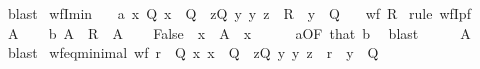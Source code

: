 \begin{isabellebody}
\ blast%
\endisatagproof
{\isafoldproof}%
%
\isadelimproof
\isanewline
%
\endisadelimproof
\isanewline
{}\isamarkupfalse%
\ wfI{\isacharunderscore}{\kern0pt}min{\isacharcolon}{\kern0pt}\isanewline
\ \ \ a{\isacharcolon}{\kern0pt}\ {\isachardoublequoteopen}{\isasymAnd}x\ Q{\isachardot}{\kern0pt}\ x\ {\isasymin}\ Q\ {\isasymLongrightarrow}\ {\isasymexists}z{\isasymin}Q{\isachardot}{\kern0pt}\ {\isasymforall}y{\isachardot}{\kern0pt}\ {\isacharparenleft}{\kern0pt}y{\isacharcomma}{\kern0pt}\ z{\isacharparenright}{\kern0pt}\ {\isasymin}\ R\ {\isasymlongrightarrow}\ y\ {\isasymnotin}\ Q{\isachardoublequoteclose}\isanewline
\ \ \ {\isachardoublequoteopen}wf\ R{\isachardoublequoteclose}\isanewline
%
\isadelimproof
%
\endisadelimproof
%
\isatagproof
{}\isamarkupfalse%
\ {\isacharparenleft}{\kern0pt}rule\ wfI{\isacharunderscore}{\kern0pt}pf{\isacharparenright}{\kern0pt}\isanewline
\ \ \isamarkupfalse%
\ A\isanewline
\ \ \isamarkupfalse%
\ b{\isacharcolon}{\kern0pt}\ {\isachardoublequoteopen}A\ {\isasymsubseteq}\ R\ {\isacharbackquote}{\kern0pt}{\isacharbackquote}{\kern0pt}\ A{\isachardoublequoteclose}\isanewline
\ \ \isamarkupfalse%
\ False\ \ {\isachardoublequoteopen}x\ {\isasymin}\ A{\isachardoublequoteclose}\ \ x\isanewline
\ \ \ \ \isamarkupfalse%
\ a{\isacharbrackleft}{\kern0pt}OF\ that{\isacharbrackright}{\kern0pt}\ b\ \isamarkupfalse%
\ blast\isanewline
\ \ \isamarkupfalse%
\ \isamarkupfalse%
\ {\isachardoublequoteopen}A\ {\isacharequal}{\kern0pt}\ {\isacharbraceleft}{\kern0pt}{\isacharbraceright}{\kern0pt}{\isachardoublequoteclose}\ \isamarkupfalse%
\ blast\isanewline
{}\isamarkupfalse%
%
\endisatagproof
{\isafoldproof}%
%
\isadelimproof
\isanewline
%
\endisadelimproof
\isanewline
{}\isamarkupfalse%
\ wf{\isacharunderscore}{\kern0pt}eq{\isacharunderscore}{\kern0pt}minimal{\isacharcolon}{\kern0pt}\ {\isachardoublequoteopen}wf\ r\ {\isasymlongleftrightarrow}\ {\isacharparenleft}{\kern0pt}{\isasymforall}Q\ x{\isachardot}{\kern0pt}\ x\ {\isasymin}\ Q\ {\isasymlongrightarrow}\ {\isacharparenleft}{\kern0pt}{\isasymexists}z{\isasymin}Q{\isachardot}{\kern0pt}\ {\isasymforall}y{\isachardot}{\kern0pt}\ {\isacharparenleft}{\kern0pt}y{\isacharcomma}{\kern0pt}\ z{\isacharparenright}{\kern0pt}\ {\isasymin}\ r\ {\isasymlongrightarrow}\ y\ {\isasymnotin}\ Q{\isacharparenright}{\kern0pt}{\isacharparenright}{\kern0pt}{\isachardoublequoteclose}\isanewline

\end{isabellebody}
